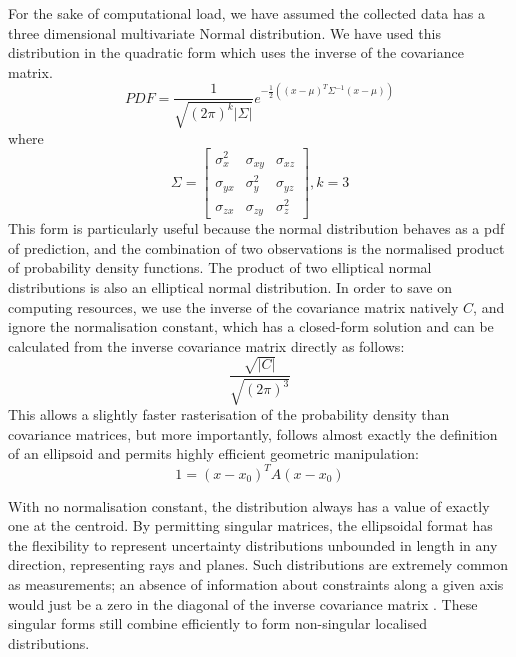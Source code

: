 \documentclass[a4paper, 11pt, titlepage]{article}
\newcounter{subsubsubsection}[subsubsection]
\begin{document}
        For the sake of computational load, we have assumed the collected data has a three dimensional multivariate Normal distribution.  We have used this distribution in the quadratic form which uses the inverse of the covariance matrix.
        \begin{equation}
        PDF = \frac{1}{\sqrt {(2\pi)^k|\Sigma|}} e^{-\frac{1}{2}\left( \left(x-\mu\right)^T \Sigma^{-1} \left(x-\mu\right) \right)}
        \end{equation}
        where
        \begin{equation}
        \Sigma=\begin{bmatrix}
          \sigma_x^2 & \sigma_{xy} & \sigma_{xz} \\[0.3em]
          \sigma_{yx} & \sigma_y^2 & \sigma_{yz} \\[0.3em]
          \sigma_{zx} & \sigma_{zy} & \sigma_z^2 
        \end{bmatrix}, k=3
        \end{equation}
        This form is particularly useful because the normal distribution behaves as a \gls{pdf} of prediction, and the combination of two observations is the normalised product of probability density functions.  The product of two elliptical normal distributions is also an elliptical normal distribution.  
        In order to save on computing resources, we use the inverse of the covariance matrix natively \(C\), and ignore the normalisation constant, which has a closed-form solution and can be calculated from the inverse covariance matrix directly as follows:
        \begin{equation}
        \frac{\sqrt{|C|}}{\sqrt{(2\pi)^3}}
        \end{equation}
        This allows a slightly faster rasterisation of the probability density than covariance matrices, but more importantly, follows almost exactly the definition of an ellipsoid and permits highly efficient geometric manipulation:
        \begin{equation}
        1 = \left(x-x_0\right)^T A \left(x-x_0\right)
        \end{equation}

        With no normalisation constant, the distribution always has a value of exactly one at the centroid.
        By permitting singular matrices, the ellipsoidal format has the flexibility to represent uncertainty distributions unbounded in length in any direction, representing rays and planes.  Such distributions are extremely common as measurements; an absence of information about constraints along a given axis would just be a zero in the diagonal of the inverse covariance matrix \cite{UncertainGeo}.  These singular forms still combine efficiently to form non-singular localised distributions.
        
\end{document}
